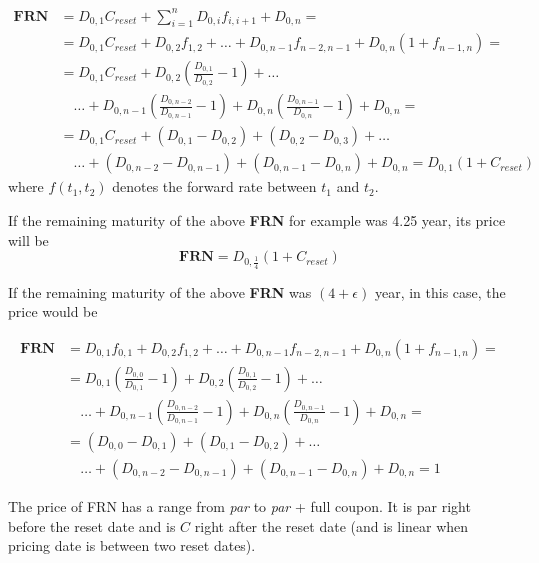 \documentclass[12pt,a4paper]{book}
\begin{document}
\begin{equation}
	\begin{aligned}
		\textbf{FRN} & = D_{0,1}C_{reset} + \sum_{i=1}^nD_{0,i}f_{i,i+1} + D_{0,n}= \\
		& = D_{0,1}C_{reset} + D_{0,2}f_{1,2} + \ldots + D_{0,n-1}f_{n-2,n-1}+ D_{0,n}(1+f_{n-1,n}) = \\
		& = D_{0,1}C_{reset} + D_{0,2}\left(\frac{D_{0,1}}{D_{0,2}}-1\right) + \ldots \\
		&\quad\ldots + D_{0,n-1}\left(\frac{D_{0,n-2}}{D_{0,n-1}}-1\right) + D_{0,n}\left(\frac{D_{0,n-1}}{D_{0,n}}-1\right) + D_{0,n} = \\
		& = D_{0,1}C_{reset} + (D_{0,1} - D_{0,2}) + (D_{0,2} - D_{0,3}) + \ldots \\
		&\quad\ldots + (D_{0,n-2} - D_{0,n-1}) + (D_{0,n-1} - D_{0,n}) + D_{0,n} = \boxed{D_{0,1} (1 +C_{reset})}
	\end{aligned}
\end{equation}
where $f(t_1,t_2)$ denotes the forward rate between $t_1$ and $t_2$.

If the remaining maturity of the above \textbf{FRN} for example was 4.25 year, its price will be
\begin{equation}
	\textbf{FRN} = D_{0,\frac{1}{4}}(1+C_{reset})
\end{equation}

If the remaining maturity of the above \textbf{FRN} was $(4 + \epsilon)$ year, in this case, the price would be

\begin{equation}
	\begin{aligned}
		\textbf{FRN} &= D_{0,1}f_{0,1}+ D_{0,2}f_{1,2} + \ldots + D_{0,n-1}f_{n-2,n-1} + D_{0,n}(1+f_{n-1,n}) = \\
		& = D_{0,1}\left(\frac{D_{0,0}}{D_{0,1}}-1\right) + D_{0,2}\left(\frac{D_{0,1}}{D_{0,2}}-1\right) + \ldots \\
		&\quad\ldots + D_{0,n-1}\left(\frac{D_{0,n-2}}{D_{0,n-1}}-1\right) + D_{0,n}\left(\frac{D_{0,n-1}}{D_{0,n}}-1\right) + D_{0,n} = \\
		&= (D_{0,0}-D_{0,1})+(D_{0,1}-D_{0,2}) + \ldots \\
		&\quad\ldots + (D_{0,n-2}-D_{0,n-1})+(D_{0,n-1}-D_{0,n})+D_{0,n} = 1
	\end{aligned}
\end{equation}

The price of FRN has a range from \emph{par} to \emph{par} + full coupon. It is par right before the reset date and is $C$ right after the reset date (and is linear when pricing date is between two reset dates).
\end{document}
